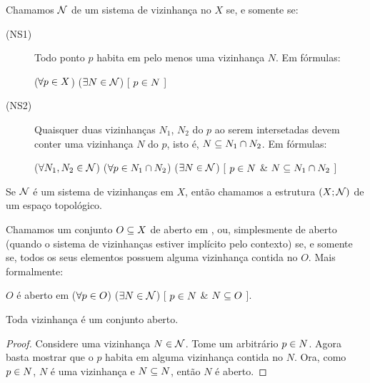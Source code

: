 \begin{definition}
	\label{def:sistema-de-vizinhanca}
	Chamamos $\mathcal{N}$ de um sistema de vizinhança no $X$ se, e somente se:
	\begin{description}
		\item[(NS1)]
		\label{def:sistema-de-vizinhanca1}
		Todo ponto $p$ habita em pelo menos uma vizinhança $N$. Em fórmulas:
		\begin{center}
			($\forall p \in X$)%
			($\exists N \in \mathcal{N}$)%
			[ $p \in N$ ]
		\end{center}

		\item[(NS2)]
		\label{def:sistema-de-vizinhanca2}
		Quaisquer duas vizinhanças $N_1$, $N_2$ do $p$ ao serem intersetadas devem conter uma vizinhança $N$ do $p$, isto é, $N \subseteq N_1 \cap N_2$. Em fórmulas:
		\begin{center}
			($\forall N_1, N_2 \in \mathcal{N}$)%
			($\forall p \in N_1 \cap N_2$)%
			($\exists N \in \mathcal{N}$)%
			[ $p \in N$ \& $N \subseteq N_1 \cap N_2$ ]
		\end{center}
	\end{description}
\end{definition}

\begin{definition}
	Se $\mathcal{N}$ é um sistema de vizinhanças em $X$, então chamamos a estrutura $(X;\mathcal{N})$ de um espaço topológico.
\end{definition}

\begin{definition}[Aberto]
	\label{def:aberto}
	Chamamos um conjunto $O \subseteq X$ de aberto em , ou, simplesmente de aberto (quando o sistema de vizinhanças estiver implícito pelo contexto) se, e somente se, todos os seus elementos possuem alguma vizinhança contida no $O$. Mais formalmente:
	\begin{center}
		$O$ é aberto em  \sse
			($\forall p \in O$)%
			($\exists N \in \mathcal{N}$)%
			[ $p \in N$ \& $N \subseteq O$ ].
	\end{center}
\end{definition}

\begin{fact}
	\label{vizinhanca-aberto}
	Toda vizinhança é um conjunto aberto.
\end{fact}

\begin{proof}
	Considere uma vizinhança $N \in \mathcal{N}$. Tome um arbitrário $p \in N$. Agora basta mostrar que o $p$ habita em alguma vizinhança contida no $N$. Ora, como $p \in N$, $N$ é uma vizinhança e $N \subseteq N$, então $N$ é aberto.
\end{proof}

